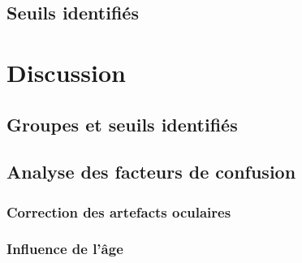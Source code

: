 \subsection{Seuils identifiés}

\section{Discussion}

\subsection{Groupes et seuils identifiés}

\subsection{Analyse des facteurs de confusion}

\subsubsection{Correction des artefacts oculaires}

\subsubsection{Influence de l'âge}